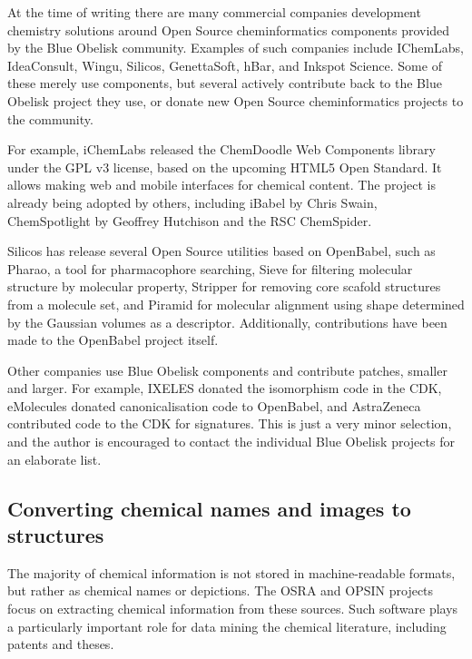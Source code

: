 \documentclass[10pt]{bmc_article}
\newenvironment{bmcformat}{\fussy\setboolean{publ}{true}}{\fussy}
\begin{document}
\begin{bmcformat}
At the time of writing there are many commercial companies development chemistry
solutions around Open Source cheminformatics components provided by the Blue Obelisk
community. Examples of such companies include IChemLabs, IdeaConsult, Wingu, Silicos,
GenettaSoft, hBar, and Inkspot Science. Some of these merely use components, but several
actively contribute back to the Blue Obelisk project they use, or donate new
Open Source cheminformatics projects to the community.

For example, iChemLabs released the ChemDoodle Web Components library under the GPL v3
license, based on the upcoming HTML5 Open Standard. It allows making web and mobile
interfaces for chemical content. The project is already being adopted by others,
including iBabel by Chris Swain\cite{iBabel}, ChemSpotlight by
Geoffrey Hutchison\cite{chemspotlight} and the RSC ChemSpider\cite{chemspider_chemdoodle}.

Silicos has release several Open Source utilities based on
OpenBabel, such as Pharao, a tool for pharmacophore searching,
Sieve for filtering molecular structure by molecular property,
Stripper for removing core scafold structures from a molecule
set, and Piramid for molecular alignment using shape determined
by the Gaussian volumes as a descriptor. Additionally,
contributions have been made to the OpenBabel project itself.

Other companies use Blue Obelisk components and contribute patches,
smaller and larger. For example, IXELES donated the isomorphism
code in the CDK, eMolecules donated canonicalisation code to
OpenBabel, and AstraZeneca contributed code to the CDK for
signatures. This is just a very minor selection, and the author
is encouraged to contact the individual Blue Obelisk projects
for an elaborate list.

\subsection*{Converting chemical names and images to structures}

The majority of chemical information is not stored in machine-readable
formats, but rather as chemical names or depictions. The OSRA and OPSIN
projects focus on extracting chemical information from these sources.
Such software plays a particularly important role for data mining the
chemical literature, including patents and theses.


\end{bmcformat}
\end{document}
